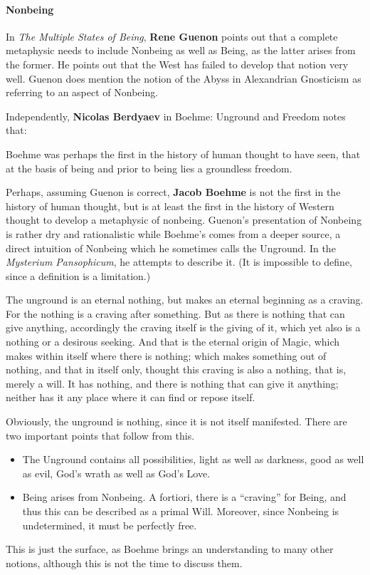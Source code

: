 \paragraph{Nonbeing}
In \emph{The Multiple States of Being}, \textbf{Rene Guenon} points out that a complete metaphysic needs to include Nonbeing as well as Being, as the latter arises from the former. He points out that the West has failed to develop that notion very well. Guenon does mention the notion of the Abyss in Alexandrian Gnosticism as referring to an aspect of Nonbeing.

Independently, \textbf{Nicolas Berdyaev} in Boehme: Unground and Freedom notes that:

\begin{quotex}
Boehme was perhaps the first in the history of human thought to have seen, that at the basis of being and prior to being lies a groundless freedom. 

\end{quotex}
Perhaps, assuming Guenon is correct, \textbf{Jacob Boehme} is not the first in the history of human thought, but is at least the first in the history of Western thought to develop a metaphysic of nonbeing. Guenon's presentation of Nonbeing is rather dry and rationalistic while Boehme's comes from a deeper source, a direct intuition of Nonbeing which he sometimes calls the Unground. In the \emph{Mysterium Pansophicum}, he attempts to describe it. (It is impossible to define, since a definition is a limitation.)

\begin{quotex}
The unground is an eternal nothing, but makes an eternal beginning as a craving. For the nothing is a craving after something. But as there is nothing that can give anything, accordingly the craving itself is the giving of it, which yet also is a nothing or a desirous seeking. And that is the eternal origin of Magic, which makes within itself where there is nothing; which makes something out of nothing, and that in itself only, thought this craving is also a nothing, that is, merely a will. It has nothing, and there is nothing that can give it anything; neither has it any place where it can find or repose itself. 

\end{quotex}
Obviously, the unground is nothing, since it is not itself manifested. There are two important points that follow from this.

\begin{itemize}
\item The Unground contains all possibilities, light as well as darkness, good as well as evil, God's wrath as well as God's Love. 
\item Being arises from Nonbeing. A fortiori, there is a “craving” for Being, and thus this can be described as a primal Will. Moreover, since Nonbeing is undetermined, it must be perfectly free. 
\end{itemize}
This is just the surface, as Boehme brings an understanding to many other notions, although this is not the time to discuss them.

